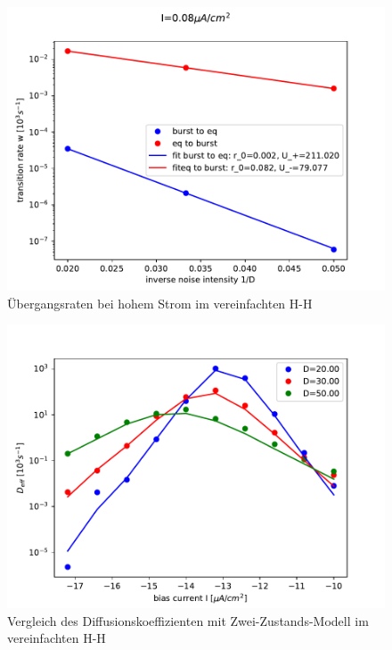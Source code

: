 \documentclass[12pt,a4paper]{article}
\begin{document}
\begin{figure}[H]
	\centering
	\includegraphics[scale=1]{arrheniustotrealrinzel25onewrealfast19jjem2stfit9.pdf}\caption{Übergangsraten bei hohem Strom im vereinfachten H-H}
	\label{arrhrinzel3}
\end{figure}
\begin{figure}[H]
	\centering
	\includegraphics[scale=1]{dcompdfpwnewrealrinzel25orealfast19jjem2st.pdf}\caption{Vergleich des Diffusionskoeffizienten mit Zwei-Zustands-Modell im vereinfachten H-H}
	\label{drinzelcomp}
\end{figure}
\end{document}
